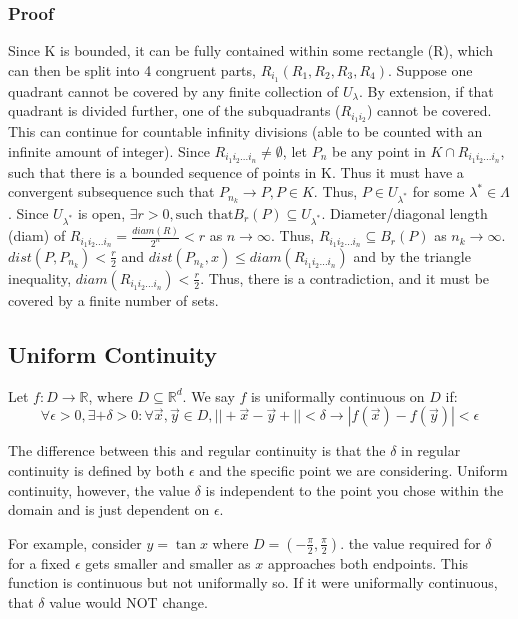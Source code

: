 \documentclass[11 pt, twoside]{article}
\begin{document}
\subsubsection{Proof}
Since K is bounded, it can be fully contained within some rectangle (R), which can then be split into 4 congruent parts, $R_{i_1} (R_1, R_2, R_3, R_4)$. Suppose one quadrant cannot be covered by any finite collection of $U_\lambda$. By extension, if that quadrant is divided further, one of the subquadrants ($R_{i_1i_2}$) cannot be covered. This can continue for countable infinity divisions (able to be counted with an infinite amount of integer). Since $R_{i_1i_2...i_n} \neq \emptyset$, let $P_n$ be any point in $K \cap R_{i_1i_2...i_n}$, such that there is a bounded sequence of points in K. Thus it must have a convergent subsequence such that $P_{n_k} \to P, P \in K$. Thus, $P \in U_{\lambda^*}$ for some $\lambda^* \in \Lambda$. Since $U_{\lambda^*}$ is open, $\exists r > 0, \text{such that} B_r(P) \subseteq U_{\lambda^*}$. Diameter/diagonal length (diam) of $ R_{i_1i_2...i_n} = \frac{diam(R)}{2^n} < r$ as $n \to \infty$. Thus, $R_{i_1i_2...i_n} \subseteq B_r(P)$ as $n_k \to \infty$. $dist(P, P_{n_k}) < \frac{r}{2}$ and $dist(P_{n_k}, x) \leq diam(R_{i_1i_2...i_n})$ and by the triangle inequality, $diam(R_{i_1i_2...i_n}) < \frac{r}{2}$. Thus, there is a contradiction, and it must be covered by a finite number of sets.

\subsection{Uniform Continuity}
Let $f: D \to \mathbb{R}$, where $D \subseteq \mathbb{R}^d$. We say $f$ is
uniformally continuous on $D$ if:
$$\forall \epsilon > 0, \exists+\delta > 0: \forall \vec{x}, \vec{y} \in D,
||+\vec{x} - \vec{y}+|| < \delta \to |f(\vec{x}) - f(\vec{y})| < \epsilon$$

The difference between this and regular continuity is that the $\delta$ in
regular continuity is defined by both $\epsilon$ and the specific point we
are considering. Uniform continuity, however, the value $\delta$ is independent
to the point you chose within the domain and is just dependent on $\epsilon$.

For example, consider $y = \tan{x}$ where $D = (-\frac{\pi}{2}, \frac{\pi}{2})$.
the value required for $\delta$ for a fixed $\epsilon$ gets smaller and
smaller as $x$ approaches both endpoints. This function is continuous but not
uniformally so. If it were uniformally continuous,
that $\delta$ value would NOT change.
\end{document}
